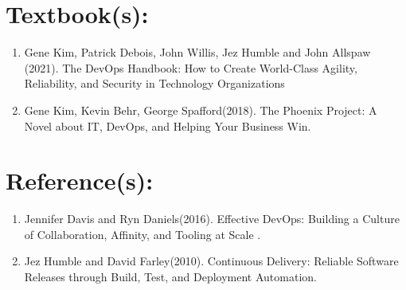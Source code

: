 \section{Textbook(s):}
\begin{enumerate}
    
    \item  Gene Kim, Patrick Debois, John Willis, Jez Humble and John Allspaw (2021). The DevOps Handbook: How to Create World-Class Agility, Reliability, and Security in Technology Organizations
    \item  Gene Kim, Kevin Behr, George Spafford(2018). The Phoenix Project: A Novel about IT, DevOps, and Helping Your Business Win.
    
\end{enumerate}


\section{Reference(s):}
\begin{enumerate}
    \item Jennifer Davis and Ryn Daniels(2016). Effective DevOps: Building a Culture of Collaboration, Affinity, and Tooling at Scale .
    \item Jez Humble and David Farley(2010). Continuous Delivery: Reliable Software Releases through Build, Test, and Deployment Automation.
\end{enumerate}